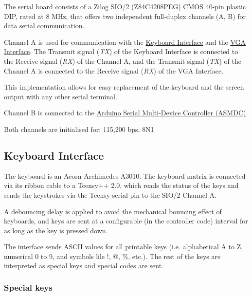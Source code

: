 \documentclass[a4paper,11pt]{article}
\begin{document}
    The serial board consists of a Zilog SIO/2 (Z84C4208PEG) CMOS 40-pin plastic
    DIP, rated at 8 MHz, that offers two independent full-duplex channels (A, B)
    for data serial communication.

    Channel A is used for communication with the \hyperref[kbd]{Keyboard
    Interface} and the \hyperref[vga]{VGA Interface}. The Transmit signal
    (\textit{TX}) of the Keyboard Interface is connected to the Receive signal
    (\textit{RX}) of the Channel A, and the Transmit signal (\textit{TX}) of the
    Channel A is connected to the Receive signal (\textit{RX}) of the VGA
    Interface.

    This implementation allows for easy replacement of the keyboard and the
    screen output with any other serial terminal.

    Channel B is connected to the \hyperref[asmdc]{Arduino Serial Multi-Device
    Controller (ASMDC)}.

    Both channels are initialised for: 115,200 bps, 8N1

    \subsection{Keyboard Interface}
    \label{kbd}

    The keyboard is an Acorn Archimedes A3010. The keyboard matrix is connected
    via its ribbon cable to a Teensy++ 2.0, which reads the status of the keys
    and sends the keystrokes via the Teensy serial pin to the SIO/2 Channel A.

    A debouncing delay is applied to avoid the mechanical bouncing effect of
    keyboards, and keys are sent at a configurable (in the controller code)
    interval for as long as the key is pressed down.

    The interface sends ASCII values for all printable keys (i.e. alphabetical
    A to Z, numerical 0 to 9, and symbols lile !, @, \%, etc.). The rest of the
    keys are interpreted as special keys and special codes are sent.

    \subsubsection{Special keys}
    
\end{document}
